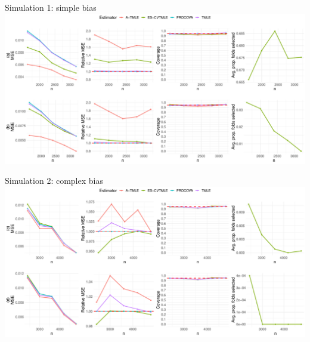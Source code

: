 \documentclass[t]{beamer}
\begin{document}
\begin{frame}{Simulation 1: simple bias}
\centering
\vspace{1cm}
\includegraphics[width=1\textwidth,height=0.65\textheight]{figures/simple.pdf}
\end{frame}


\begin{frame}{Simulation 2: complex bias}
\centering
\vspace{1cm}
\includegraphics[width=1\textwidth,height=0.65\textheight]{figures/complex.pdf}
\end{frame}
\end{document}
